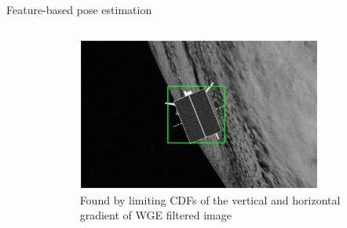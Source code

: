 \documentclass[10pt]{beamer}
\begin{document}
\begin{frame}{Feature-based pose estimation}
\begin{columns}[T,onlytextwidth]
\begin{column}{0.5\textwidth}
\begin{figure}
        \hspace{0.1cm}
      \end{figure}
    \end{column}
    \begin{column}{0.5\textwidth}
      \vspace{0.6cm}
      \begin{figure}
        \captionsetup[subfigure]{labelformat=empty}
        \includegraphics[width=0.82\textwidth]{gfx/FeatureDetection/ROI.eps}\\
        {\footnotesize Found by limiting CDFs of the vertical and horizontal gradient of WGE filtered image}
      \end{figure}
    \end{column}
  \end{columns}


\end{frame}
\end{document}
